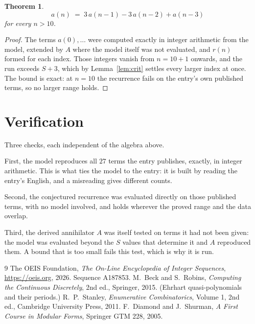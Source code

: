 \documentclass[11pt,a4paper]{article}
\theoremstyle{plain}
\newtheorem{theorem}{Theorem}
\theoremstyle{definition}
\begin{document}
\begin{theorem}
\[
a(n)\;=\;3\,a(n-1) - 3\,a(n-2) + a(n-3)
\]
for every $n>10$.
\end{theorem}

\begin{proof}
The terms $a(0),\dots$ were computed exactly in integer arithmetic from the model, extended by
$A$ where the model itself was not evaluated, and $r(n)$ formed for each index. Those integers
vanish from $n=10+1$ onwards, and the run exceeds $S+3$, which by
Lemma~\ref{lem:crit} settles every larger index at once. The bound is exact: at $n=10$ the recurrence fails on the entry's own published terms, so no larger range holds.
\end{proof}

\section{Verification}

Three checks, each independent of the algebra above.

First, the model reproduces all $27$ terms the entry publishes, exactly, in integer
arithmetic. This is what ties the model to the entry: it is built by reading the entry's
English, and a misreading gives different counts.

Second, the conjectured recurrence was evaluated directly on those published terms, with no
model involved, and holds wherever the proved range and the data overlap.

Third, the derived annihilator $A$ was itself tested on terms it had not been given: the model
was evaluated beyond the $S$ values that determine it and $A$ reproduced them. A bound that is
too small fails this test, which is why it is run.

\begin{thebibliography}{9}
 The OEIS Foundation, \emph{The On-Line Encyclopedia of Integer
Sequences}, \url{https://oeis.org}, 2026. Sequence A187853.
 M.~Beck and S.~Robins, \emph{Computing the Continuous Discretely},
2nd ed., Springer, 2015. (Ehrhart quasi-polynomials and their periods.)
 R.~P.~Stanley, \emph{Enumerative Combinatorics}, Volume 1, 2nd ed.,
Cambridge University Press, 2011.
 F.~Diamond and J.~Shurman, \emph{A First Course in Modular Forms},
Springer GTM 228, 2005.
\end{thebibliography}
\end{document}
